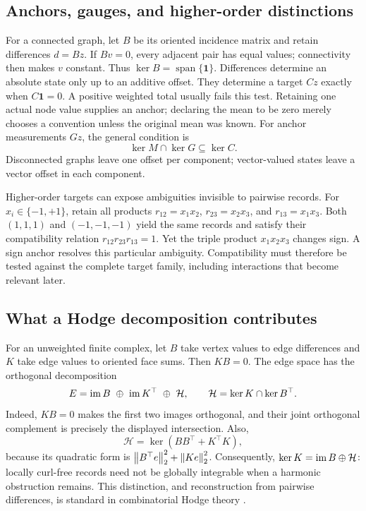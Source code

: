 \subsection{Anchors, gauges, and higher-order distinctions}
\label{atl:gauges}

For a connected graph, let $B$ be its oriented incidence matrix and retain
differences $d=Bz$. If $Bv=0$, every adjacent pair has equal values; connectivity
then makes $v$ constant. Thus $\ker B=\operatorname{span}\{\mathbf1\}$.
Differences determine an absolute state only up to an additive offset. They
determine a target $Cz$ exactly when $C\mathbf1=0$. A positive weighted total
usually fails this test. Retaining one actual node value supplies an anchor;
declaring the mean to be zero merely chooses a convention unless the original
mean was known. For anchor measurements $Gz$, the general condition is
\begin{equation}
  \ker M\cap\ker G\subseteq\ker C.
  \label{atl:anchor-condition}
\end{equation}
Disconnected graphs leave one offset per component; vector-valued states leave
a vector offset in each component.

Higher-order targets can expose ambiguities invisible to pairwise records.
For $x_i\in\{-1,+1\}$, retain all products
$r_{12}=x_1x_2$, $r_{23}=x_2x_3$, and $r_{13}=x_1x_3$.
Both $(1,1,1)$ and $(-1,-1,-1)$ yield the same records and satisfy their
compatibility relation $r_{12}r_{23}r_{13}=1$. Yet the triple product
$x_1x_2x_3$ changes sign. A sign anchor resolves this particular ambiguity.
Compatibility must therefore be tested against the complete target family,
including interactions that become relevant later.

\subsection{What a Hodge decomposition contributes}
\label{atl:hodge}

For an unweighted finite complex, let $B$ take vertex values to edge
differences and $K$ take edge values to oriented face sums. Then $KB=0$.
The edge space has the orthogonal decomposition
\begin{equation}
  E=\operatorname{im} B\ \oplus\ \operatorname{im} K^\top\ \oplus\ \mathcal H,
  \qquad
  \mathcal H=\ker K\cap\ker B^\top.
  \label{atl:hodge-decomposition}
\end{equation}
Indeed, $KB=0$ makes the first two images orthogonal, and their joint
orthogonal complement is precisely the displayed intersection. Also,
\begin{equation}
  \mathcal H=\ker(BB^\top+K^\top K),
  \label{atl:harmonic-kernel}
\end{equation}
because its quadratic form is
$\left\lVert B^\top e\right\rVert_2^2+\left\lVert Ke\right\rVert_2^2$. Consequently,
$\ker K=\operatorname{im} B\oplus\mathcal H$: locally curl-free records need not be
globally integrable when a harmonic obstruction remains. This distinction,
and reconstruction from pairwise differences, is standard in combinatorial
Hodge theory \citep{hodge}.

